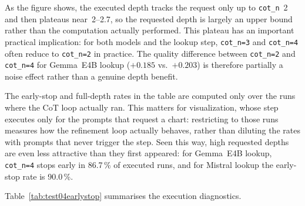 As the figure shows, the executed depth tracks the request only up to
\texttt{cot\_n}~2 and then plateaus near~2--2.7, so the requested depth is
largely an upper bound rather than the computation actually performed. This
plateau has an important practical implication: for
both models and the lookup step, \texttt{cot\_n=3} and \texttt{cot\_n=4}
often reduce to \texttt{cot\_n=2} in practice. The quality difference
between \texttt{cot\_n=2} and \texttt{cot\_n=4} for Gemma~E4B lookup
($+0.185$ vs.\ $+0.203$) is therefore partially a noise effect rather
than a genuine depth benefit.

The early-stop and full-depth rates in the table are computed only over the
runs where the CoT loop actually ran. This matters for visualization, whose
step executes only for the prompts that request a chart: restricting to those
runs measures how the refinement loop actually behaves, rather than diluting the
rates with prompts that never trigger the step. Seen this way, high requested
depths are even less attractive than they first appeared: for Gemma~E4B lookup,
\texttt{cot\_n=4} stops early in 86.7\,\% of executed runs, and for Mistral
lookup the early-stop rate is 90.0\,\%.

Table~\ref{tab:test04earlystop} summarises the execution diagnostics.

